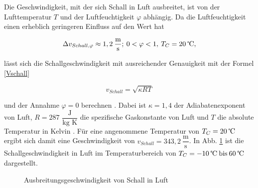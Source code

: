 Die Geschwindigkeit, mit der sich Schall in Luft ausbreitet, ist von der Lufttemperatur $T$ und der Luftfeuchtigkeit $\varphi$ abhängig. Da die Luftfeuchtigkeit einen erheblich geringeren Einfluss auf den Wert hat 

\begin{equation}
    \Delta v_{Schall,\varphi}\approx1,2\:\dfrac{\text{m}}{\text{s}}; \:0<\varphi<1, \:T_{C}=20 \:\text{\textcelsius},
    \label{Vphi}
\end{equation}

\cite{Hering:2023} lässt sich die Schallgeschwindigkeit mit ausreichender Genauigkeit mit der Formel \ref{Vschall}

\begin{equation}
    v_{Schall}=\sqrt{\kappa R T}
    \label{Vschall}
\end{equation} 

und der Annahme $\varphi=0$ berechnen \cite{Tipler:2024}. 
Dabei ist $\kappa = 1{,}4$ der Adiabatenexponent von Luft, $R=287$ \(\dfrac{\text{J}}{\text{kg K}}\) die spezifische Gaskonstante von Luft und $T$ die absolute Temperatur in Kelvin \cite{Tipler:2024,Willems:2022}.
Für eine angenommene Temperatur von $T_{C} = 20\:\text{\textcelsius}$ ergibt sich damit eine Geschwindigkeit von $v_{Schall}=343,2\:\dfrac{\text{m}}{\text{s}}$.
In Abb. \ref{schallfunktion} ist die Schallgeschwindigkeit in Luft im Temperaturbereich von $T_{C} = -10 \:\text{\textcelsius \:bis} \:60 \:\text{\textcelsius}$ dargestellt.

\begin{figure}[h]
    \begin{center}
        \caption{Ausbreitungsgeschwindigkeit von Schall in Luft}
        \label{schallfunktion}
    \end{center}
\end{figure}

